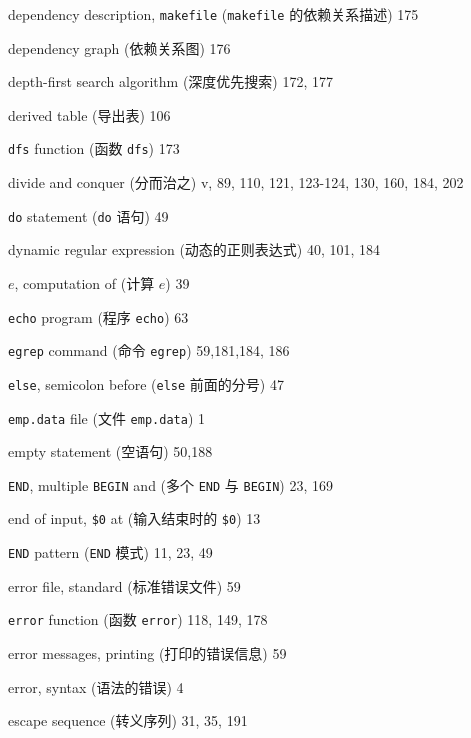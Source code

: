 \begin{multicols}{3}
\hangindent=3pc  dependency description, \verb'makefile'
(\verb'makefile' 的依赖关系描述) 175

\hangindent=3pc  dependency graph (依赖关系图) 176

\hangindent=3pc  depth-first search algorithm (深度优先搜索) 172, 177

\hangindent=3pc  derived table (导出表) 106

\hangindent=3pc  \verb'dfs' function (函数 \verb'dfs') 173

\hangindent=3pc  divide and conquer (分而治之) v, 89, 110, 121, 123-124, 130, 160, 184, 202

\hangindent=3pc  \verb'do' statement (\verb'do' 语句) 49

\hangindent=3pc  dynamic regular expression (动态的正则表达式) 40,  101, 184

\hangindent=3pc  $e$, computation of (计算 $e$) 39

\hangindent=3pc  \verb'echo' program (程序 \verb'echo') 63

\hangindent=3pc  \verb'egrep' command (命令 \verb'egrep') 59,181,184, 186

\hangindent=3pc  \verb'else', semicolon before (\verb'else'
前面的分号) 47

\hangindent=3pc  \verb'emp.data' file (文件 \verb'emp.data') 1

\hangindent=3pc  empty statement (空语句) 50,188

\hangindent=3pc  \verb'END', multiple \verb'BEGIN' and (多个
\verb'END' 与 \verb'BEGIN') 23, 169

\hangindent=3pc  end of input, \verb'$0' at (输入结束时的
\verb'$0') 13

\hangindent=3pc  \verb'END' pattern (\verb'END' 模式) 11, 23, 49

\hangindent=3pc  error file, standard (标准错误文件) 59

\hangindent=3pc  \verb'error' function (函数 \verb'error')
118, 149, 178

\hangindent=3pc  error messages, printing (打印的错误信息) 59

\hangindent=3pc  error, syntax (语法的错误) 4

\hangindent=3pc  escape sequence (转义序列) 31, 35, 191


\end{multicols}
